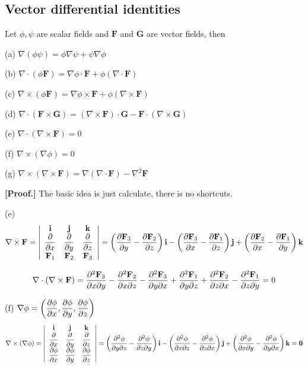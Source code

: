 \documentclass[11pt, a4paper]{MATH2023}
\newcommand{\ii}{{\bf i}}
\newcommand{\jj}{{\bf j}}
\newcommand{\kk}{{\bf k}}
\newcommand{\FF}{{\bf F}}
\newcommand{\pt}{\partial}
\begin{document}
\begin{spacing}{1.3}
    \newpage
    \subsection{Vector differential identities}
    Let $\phi, \psi$ are scalar fields and $\mathbf{F}$ and $\mathbf{G}$ are vector fields, then

    (a) $\nabla(\phi \psi)=\phi \nabla \psi+\psi \nabla \phi$

    (b) $\nabla \cdot(\phi \mathbf{F})=\nabla \phi \cdot \mathbf{F}+\phi(\nabla \cdot \mathbf{F})$

    (c) $\nabla \times(\phi \mathbf{F})=\nabla \phi \times \mathbf{F}+\phi(\nabla \times \mathbf{F})$

    (d) $\nabla \cdot(\mathbf{F} \times \mathbf{G})=(\nabla \times \mathbf{F}) \cdot \mathbf{G}-\mathbf{F} \cdot(\nabla \times \mathbf{G})$
    
    (e) $\nabla \cdot(\nabla \times \mathbf{F})=0$
    
    (f) $\nabla \times(\nabla \phi)=0$
    
    (g) $\nabla \times(\nabla \times \mathbf{F})=\nabla(\nabla \cdot \mathbf{F})-\nabla^{2} \mathbf{F}$

    \vspace{0.2in}
    {\bf [Proof.]} {\blue The basic idea is just calculate, there is no shortcuts.}

    (e) $$\nabla \times \FF = \left|\begin{array}{ccc}
        \ii & \jj & \kk \\
        \dfrac{\pt }{\pt x} & \dfrac{\pt }{\pt y} & \dfrac{\pt }{\pt z}\\
        \FF_1 & \FF_2 & \FF_3
    \end{array} \right| 
    = \left(\frac{\pt \FF_3}{\pt y}-\frac{\pt \FF_2}{\pt z}\right) \ii -
    \left(\frac{\pt \FF_3}{\pt x}-\frac{\pt \FF_1}{\pt z}\right) \jj + 
    \left(\frac{\pt \FF_2}{\pt x}-\frac{\pt \FF_1}{\pt y}\right) \kk $$

    $$\nabla\cdot (\nabla\times \FF)=
    \frac{\pt^2 \FF_3}{\pt x\pt y}-\frac{\pt^2 \FF_2}{\pt x\pt z}-\frac{\pt^2 \FF_3}{\pt y \pt x}
    +\frac{\pt^2 \FF_1}{\pt y\pt z}+\frac{\pt^2 \FF_2}{\pt z\pt x}-\frac{\pt^2 \FF_1}{\pt z \pt y}=0$$

    (f) $\disp \nabla \phi=\left(\frac{\pt \phi}{\pt x},\frac{\pt \phi}{\pt y},\frac{\pt \phi}{\pt z}\right)$
    $$\nabla \times (\nabla \phi)=\left|\begin{array}{ccc}
        \ii & \jj & \kk \\
        \dfrac{\pt }{\pt x} & \dfrac{\pt }{\pt y} & \dfrac{\pt }{\pt z}\\
        \dfrac{\pt \phi}{\pt x} & \dfrac{\pt \phi}{\pt y} & \dfrac{\pt \phi}{\pt z}
    \end{array} \right|
    =\left(\frac{\pt^2 \phi}{\pt y \pt z}-\frac{\pt^2 \phi}{\pt z \pt y}\right)\ii -
    \left(\frac{\pt^2 \phi}{\pt x \pt z}-\frac{\pt^2 \phi}{\pt z \pt x}\right)\jj +
    \left(\frac{\pt^2 \phi}{\pt x \pt y}-\frac{\pt^2 \phi}{\pt y \pt x}\right)\kk
    ={\bf 0}$$


\end{spacing}
\end{document}
